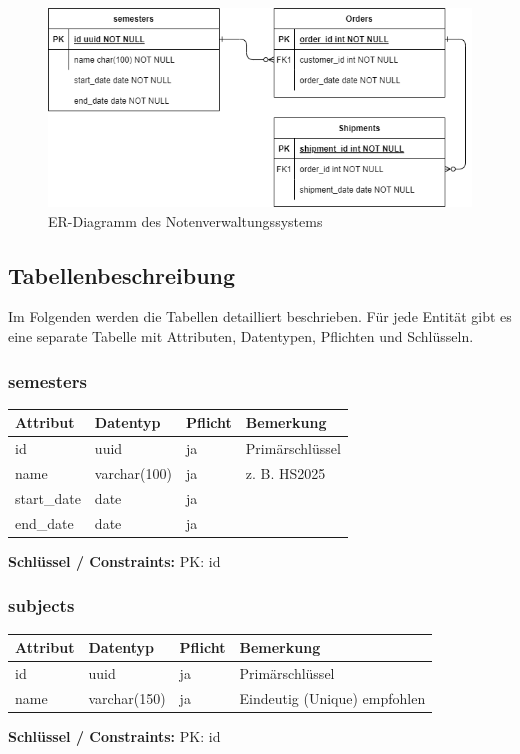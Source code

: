 \documentclass[12pt,a4paper]{article}
\begin{document}
    \begin{figure}[H]
        \centering
        \includegraphics[scale=0.65]{diagrams/nv-erd}
        \caption{ER-Diagramm des Notenverwaltungssystems}
        \label{fig:erd}
    \end{figure}

    \subsection{Tabellenbeschreibung}
    Im Folgenden werden die Tabellen detailliert beschrieben. Für jede Entität gibt es eine separate Tabelle mit Attributen, Datentypen, Pflichten und Schlüsseln.

    \subsubsection{semesters}
    \begin{longtable}{|L{4cm}|L{3cm}|L{3cm}|L{4cm}|}
        \hline
        \textbf{Attribut} & \textbf{Datentyp} & \textbf{Pflicht} & \textbf{Bemerkung} \\ \hline
        id & uuid & ja & Primärschlüssel \\ \hline
        name & varchar(100) & ja & z. B. HS2025 \\ \hline
        start\_date & date & ja &  \\ \hline
        end\_date & date & ja &  \\ \hline
    \end{longtable}
    \textbf{Schlüssel / Constraints:} PK: id

    \subsubsection{subjects}
    \begin{longtable}{|L{4cm}|L{3cm}|L{3cm}|L{4cm}|}
        \hline
        \textbf{Attribut} & \textbf{Datentyp} & \textbf{Pflicht} & \textbf{Bemerkung} \\ \hline
        id & uuid & ja & Primärschlüssel \\ \hline
        name & varchar(150) & ja & Eindeutig (Unique) empfohlen \\ \hline
    \end{longtable}
    \textbf{Schlüssel / Constraints:} PK: id
\end{document}
